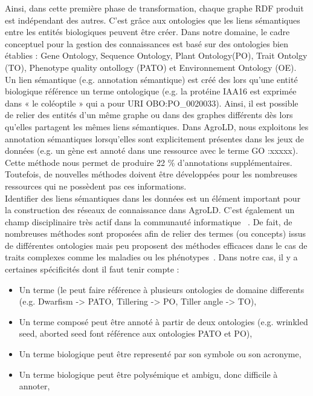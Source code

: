 Ainsi, dans cette première phase de transformation, chaque graphe RDF produit est indépendant des autres. C’est grâce aux ontologies que les liens sémantiques entre les entités biologiques peuvent être créer. Dans notre domaine, le cadre conceptuel pour la gestion des connaissances est basé sur des ontologies bien établies : Gene Ontology, Sequence Ontology, Plant Ontology(PO), Trait Ontolgy (TO), Phenotype quality ontollogy (PATO) et Environnement Ontology (OE). Un lien sémantique (e.g. annotation sémantique) est créé des lors qu’une entité biologique référence un terme ontologique (e.g. la protéine IAA16 est exprimée dans « le coléoptile » qui a pour URI OBO:PO\_0020033). Ainsi, il est possible de relier des entités d’un même graphe ou dans des graphes différents dès lors qu’elles partagent les mêmes liens sémantiques. Dans AgroLD, nous exploitons les annotation sémantiques lorsqu’elles sont explicitement présentes dans les jeux de données (e.g. un gène est annoté dans une ressource avec le terme GO :xxxxx). Cette méthode nous permet de produire 22 \% d’annotations supplémentaires. Toutefois, de nouvelles méthodes doivent être développées pour les nombreuses ressources qui ne possèdent pas ces informations.\\

Identifier des liens sémantiques dans les données est un élément important pour la construction des réseaux de connaissance dans AgroLD. C’est également un champ disciplinaire très actif dans la communauté informatique~\cite{Faria2013,Otero-Cerdeira2015} . De fait, de nombreuses méthodes sont proposées afin de relier des termes (ou concepts) issus de différentes ontologies mais peu proposent des méthodes efficaces dans le cas de traits complexes comme les maladies ou les phénotypes~\cite{harrow2017}. Dans notre cas, il y a certaines spécificités dont il faut tenir compte : \\


\begin{itemize}
\item Un terme (le  peut faire référence à plusieurs ontologies de domaine differents (e.g. Dwarfism -> PATO, Tillering -> PO, Tiller angle -> TO),
\item Un terme composé peut être annoté à partir de deux ontologies (e.g. wrinkled seed, aborted seed font référence aux ontologies PATO et PO),
\item Un terme biologique peut être representé par son symbole ou son acronyme,
\item Un terme biologique peut être polysémique et ambigu, donc difficile à annoter,\\
\end{itemize}

